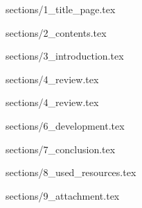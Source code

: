 \documentclass[a4paper,12pt]{report}
\begin{document}
{sections/1_title_page.tex}

\large
\sloppy
\onehalfspacing

{sections/2_contents.tex}

{sections/3_introduction.tex}

{sections/4_review.tex}

{sections/4_review.tex}

{sections/6_development.tex}

{sections/7_conclusion.tex}

{sections/8_used_resources.tex}

{sections/9_attachment.tex}
\end{document}
